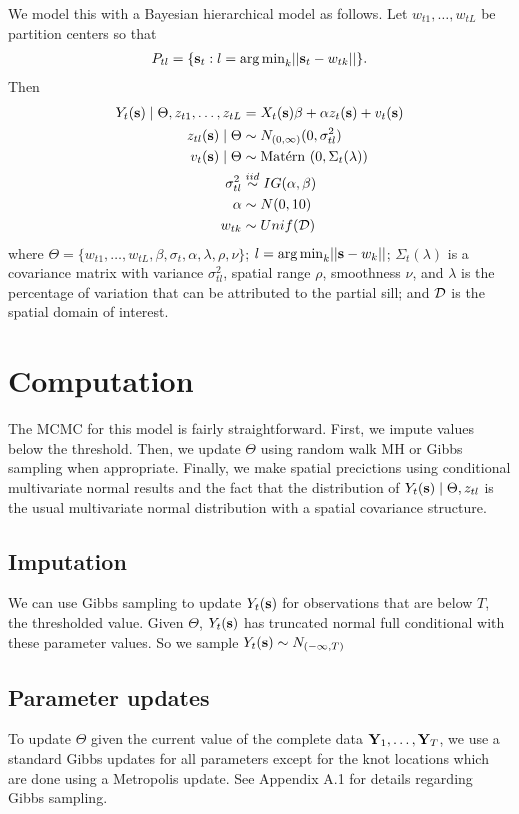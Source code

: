 \documentclass[11pt]{article}
\begin{document}
We model this with a Bayesian hierarchical model as follows.
Let $w_{t1}, \ldots, w_{tL}$ be partition centers so that
\begin{align*}
  P_{tl} = \{\mbox{\bf s}_t : l = {\mathop{\rm arg\, min}}_k || \mbox{\bf s}_t - w_{tk} ||\}.
\end{align*}
Then
\begin{align}
    Y_t(\mbox{\bf s}) \mid \Theta, z_{t1}, \ldots, z_{tL} &= X_t(\mbox{\bf s}) \beta + \alpha z_t(\mbox{\bf s}) + v_t(\mbox{\bf s}) \label{eq:hier}\\
    z_{tl}(\mbox{\bf s}) \mid \Theta &\sim N_{(0, \infty)}(0, \sigma^2_{tl})\\
    v_t(\mbox{\bf s}) \mid \Theta &\sim \mbox{Mat$\acute{\mbox{e}}$rn }(0, \Sigma_t(\lambda))\\
    \sigma^2_{tl} &\stackrel{iid}{\sim} IG(\alpha, \beta)\\
    \alpha &\sim N(0, 10)\\
    w_{tk} &\sim Unif({\cal D})
\end{align}
where $\Theta = \{w_{t1}, \ldots, w_{tL}, \beta, \sigma_t, \alpha, \lambda, \rho, \nu \}$; $l = {\mathop{\rm arg\, min}}_k ||\mbox{\bf s} - w_k ||$; $\Sigma_t(\lambda)$ is a \Matern covariance matrix with variance $\sigma_{tl}^2$, spatial range $\rho$, smoothness $\nu$, and $\lambda$ is the percentage of variation that can be attributed to the partial sill; and ${\cal D}$ is the spatial domain of interest.

\section{Computation}\label{s:comp}
The MCMC for this model is fairly straightforward.
First, we impute values below the threshold.
Then, we update $\Theta$ using random walk MH or Gibbs sampling when appropriate.
Finally, we make spatial precictions using conditional multivariate normal results and the fact that the distribution of $Y_t(\mbox{\bf s}) \mid \Theta, z_{tl}$ is the usual multivariate normal distribution with a \Matern spatial covariance structure.

\subsection{Imputation}\label{s:impute}
We can use Gibbs sampling to update $Y_t(\mbox{\bf s})$ for observations that are below $T$, the thresholded value. Given $\Theta$, $Y_t(\mbox{\bf s})$ has truncated normal full conditional with these parameter values.
So we sample $Y_t(\mbox{\bf s}) \sim N_{(-\infty, T)}$

\subsection{Parameter updates}\label{s:params}
To update $\Theta$ given the current value of the complete data $\mbox{\bf Y}_1, \ldots, \mbox{\bf Y}_T$, we use a standard Gibbs updates for all parameters except for the knot locations which are done using a Metropolis update.
See Appendix A.1 for details regarding Gibbs sampling.
\end{document}

